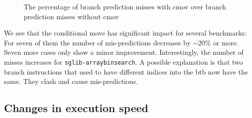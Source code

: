 \documentclass[12pt,twoside,notitlepage]{report}
\begin{document}
\begin{figure}[htp]
\caption{The percentage of branch prediction misses with cmov over branch prediction misses without cmov}
\end{figure}

We see that the conditional move has significant impact for several benchmarks: For seven of them the number of mis-predictions decreases by $\sim 20\%$ or more. Seven more cases only show a minor improvement. Interestingly, the number of misses increases for \texttt{sglib-arraybinsearch}. A possible explanation is that two branch instructions that used to have different indices into the \gls{btb} now have the same. They clash and cause mis-predictions.

\subsection{Changes in execution speed}
\end{document}
